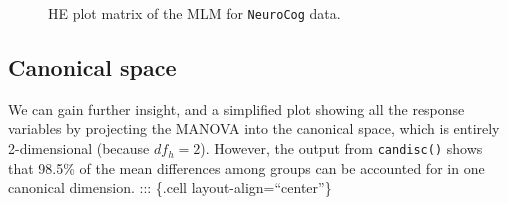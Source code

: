 \documentclass[
  letterpaper,
  10pt,
  krantz2]{krantz}
\begin{document}
{\begin{figure}[H]


\caption{\label{fig-NC-HE-pairs}HE plot matrix of the MLM for
\texttt{NeuroCog} data.}

\end{figure}%

\subsection{Canonical space}\label{canonical-space}

We can gain further insight, and a simplified plot showing all the
response variables by projecting the MANOVA into the canonical space,
which is entirely 2-dimensional (because \(df_h=2\)). However, the
output from \texttt{candisc()} shows that 98.5\% of the mean differences
among groups can be accounted for in one canonical dimension. :::
\{.cell layout-align=``center''\}

}
\end{document}
